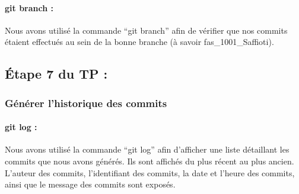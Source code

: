 \documentclass[
  letterpaper,
  DIV=11,
  numbers=noendperiod]{scrartcl}
\let\oldparagraph\paragraph
\renewcommand{\paragraph}[1]{\oldparagraph{#1}\mbox{}}
\begin{document}
\hypertarget{git-branch}{%
\paragraph{git branch :}\label{git-branch}}

Nous avons utilisé la commande ``git branch'' afin de vérifier que nos
commits étaient effectués au sein de la bonne branche (à savoir
fas\_1001\_Saffioti).

\hypertarget{uxe9tape-7-du-tp}{%
\subsection{Étape 7 du TP :}\label{uxe9tape-7-du-tp}}

\hypertarget{guxe9nuxe9rer-lhistorique-des-commits}{%
\subsubsection{Générer l'historique des
commits}\label{guxe9nuxe9rer-lhistorique-des-commits}}

\hypertarget{git-log}{%
\paragraph{git log :}\label{git-log}}

Nous avons utilisé la commande ``git log'' afin d'afficher une liste
détaillant les commits que nous avons générés. Ils sont affichés du plus
récent au plus ancien. L'auteur des commits, l'identifiant des commits,
la date et l'heure des commits, ainsi que le message des commits sont
exposés.
\end{document}
